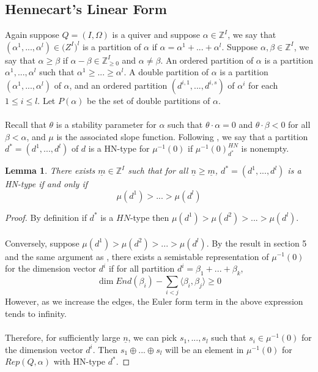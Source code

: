 \documentclass[12pt]{amsart}
\theoremstyle{plain}
\newtheorem{lem}[thm]{Lemma}
\theoremstyle{definition}
\theoremstyle{remark}
\begin{document}
\subsection{Hennecart's Linear Form} Again suppose $Q=(I,\Omega)$ is a quiver and suppose $\alpha\in\mathbb Z^I$, we say that $(\alpha^1,...,\alpha^l)\in \mathbb (Z^I)^l$ is a partition of $\alpha$ if $\alpha=\alpha^1+...+\alpha^l$.  Suppose $\alpha,\beta\in\mathbb Z^I$, we say that $\alpha\geq\beta$ if $\alpha-\beta\in\mathbb Z_{\geq 0}^I$ and $\alpha\neq \beta$. An ordered partition of $\alpha$ is a partition $\alpha^1,...,\alpha^l$ such that $\alpha^1\geq...\geq \alpha^l$. A double partition of $\alpha$ is a partition $(\alpha^1,...,\alpha^l)$ of $\alpha$, and an ordered partition $(d^{i,1},...,d^{i,s})$ of $\alpha^i$ for each $1\leq i\leq l$. Let $P(\alpha)$ be the set of double partitions of $\alpha$.
\\~\\ Recall that $\theta$ is a stability parameter for $\alpha$ such that $\theta\cdot\alpha=0$ and $\theta\cdot\beta<0$ for all $\beta<\alpha$, and $\mu$ is the associated slope function. Following \cite{reineke2003hn}, we say that a partition $d^*=(d^1,...,d^l)$ of $d$ is a HN-type for $\mu^{-1}(0)$ if $\mu^{-1}(0)_{d^*}^{HN}$ is nonempty.
\begin{lem}
    There exists $\underline{m}\in\mathbb Z^I$ such that for all $\underline{n}\geq\underline{m}$, $d^*=(d^1,...,d^l)$ is a HN-type if and only if 
    $$\mu(d^1)>...>\mu(d^l)$$
\end{lem}
\begin{proof}
    By definition if $d^*$ is a $HN$-type then $\mu(d^1)>\mu(d^2)>...>\mu(d^l)$.
    \\~\\ Conversely, suppose $\mu(d^1)>\mu(d^2)>...>\mu(d^l)$. By the result in section 5 and the same argument as \cite[Corollary 3.5]{reineke2003hn}, there exists a semistable representation of $\mu^{-1}(0)$ for the dimension vector $d^i$ if for all partition $d^i=\beta_1+...+\beta_k$,
    $$\dim End(\beta_i)-\sum_{i<j}\langle \beta_i,\beta_j\rangle\geq 0 $$
    However, as we increase the edges, the Euler form term in the above expression tends to infinity.
    \\~\\ Therefore, for sufficiently large $\underline{n}$, we can pick $s_1,...,s_l$ such that $s_i\in \mu^{-1}(0)$ for the dimension vector $d^i$. Then $s_1\oplus...\oplus s_l$ will be an element in $\mu^{-1}(0)$ for $Rep(Q,\alpha)$ with HN-type $d^*$.
    
\end{proof}
\end{document}
